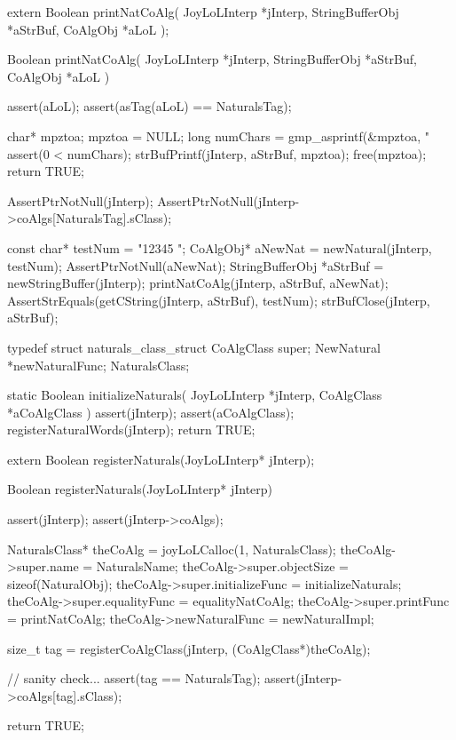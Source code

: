 \startCHeader
extern Boolean printNatCoAlg(
  JoyLoLInterp    *jInterp,
  StringBufferObj *aStrBuf,
  CoAlgObj        *aLoL
);
\stopCHeader
{}

\startCCode
Boolean printNatCoAlg(
  JoyLoLInterp    *jInterp,
  StringBufferObj *aStrBuf,
  CoAlgObj        *aLoL
) {
  assert(aLoL);
  assert(asTag(aLoL) == NaturalsTag);

  char* mpztoa;
  mpztoa = NULL;
  long numChars = gmp_asprintf(&mpztoa, "%
  assert(0 < numChars);
  strBufPrintf(jInterp, aStrBuf, mpztoa);
  free(mpztoa);
  return TRUE;
}
\stopCCode


\startCTest
  AssertPtrNotNull(jInterp);
  AssertPtrNotNull(jInterp->coAlgs[NaturalsTag].sClass);

  const char* testNum = "12345 ";
  CoAlgObj* aNewNat = newNatural(jInterp, testNum);
  AssertPtrNotNull(aNewNat);
  StringBufferObj *aStrBuf = newStringBuffer(jInterp);
  printNatCoAlg(jInterp, aStrBuf, aNewNat);
  AssertStrEquals(getCString(jInterp, aStrBuf), testNum);
  strBufClose(jInterp, aStrBuf);
\stopCTest
\stopTestCase
\stopTestSuite

\startTestSuite[registerSymbols]

\startCHeader
typedef struct naturals_class_struct {
  CoAlgClass super;
  NewNatural *newNaturalFunc;
} NaturalsClass;
\stopCHeader

\startCCode
static Boolean initializeNaturals(
  JoyLoLInterp *jInterp,
  CoAlgClass   *aCoAlgClass
) {
  assert(jInterp);
  assert(aCoAlgClass);
  registerNaturalWords(jInterp);
  return TRUE;
}
\stopCCode

\startCHeader
extern Boolean registerNaturals(JoyLoLInterp* jInterp);
\stopCHeader
{}

\startCCode
Boolean registerNaturals(JoyLoLInterp* jInterp) {
  assert(jInterp);
  assert(jInterp->coAlgs);
  
  NaturalsClass* theCoAlg        = joyLoLCalloc(1, NaturalsClass);
  theCoAlg->super.name           = NaturalsName;
  theCoAlg->super.objectSize     = sizeof(NaturalObj);
  theCoAlg->super.initializeFunc = initializeNaturals;
  theCoAlg->super.equalityFunc   = equalityNatCoAlg;
  theCoAlg->super.printFunc      = printNatCoAlg;
  theCoAlg->newNaturalFunc       = newNaturalImpl;

  size_t tag =
    registerCoAlgClass(jInterp, (CoAlgClass*)theCoAlg);
  
  // sanity check...
  assert(tag == NaturalsTag);
  assert(jInterp->coAlgs[tag].sClass);

  return TRUE;
}
\stopCCode

